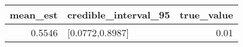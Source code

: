 \begin{longtable}{rlr}
\toprule
mean\_est & credible\_interval\_95 & true\_value \\ 
\midrule
0.5546 & [0.0772,0.8987] & 0.01 \\ 
\bottomrule
\end{longtable}

